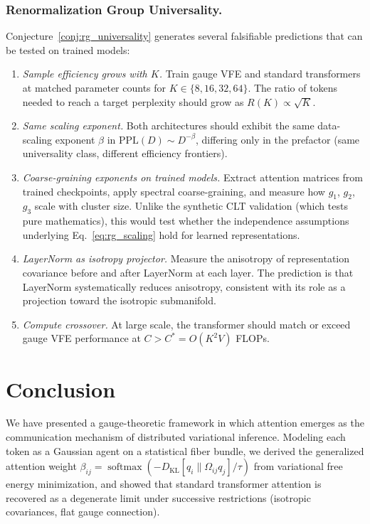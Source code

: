 \documentclass[twoside,11pt]{article}
\newcommand{\softmax}{\operatorname{softmax}}
\newcommand{\KL}{\operatorname{KL}}
\begin{document}
\subsubsection{Renormalization Group Universality.}

Conjecture~\ref{conj:rg_universality} generates several falsifiable predictions that can be tested on trained models:
\begin{enumerate}
\item \emph{Sample efficiency grows with $K$.} Train gauge VFE and standard transformers at matched parameter counts for $K \in \{8, 16, 32, 64\}$. The ratio of tokens needed to reach a target perplexity should grow as $R(K) \propto \sqrt{K}$.
\item \emph{Same scaling exponent.} Both architectures should exhibit the same data-scaling exponent $\beta$ in $\mathrm{PPL}(D) \sim D^{-\beta}$, differing only in the prefactor (same universality class, different efficiency frontiers).
\item \emph{Coarse-graining exponents on trained models.} Extract attention matrices from trained checkpoints, apply spectral coarse-graining, and measure how $g_1$, $g_2$, $g_3$ scale with cluster size. Unlike the synthetic CLT validation (which tests pure mathematics), this would test whether the independence assumptions underlying Eq.~\eqref{eq:rg_scaling} hold for learned representations.
\item \emph{LayerNorm as isotropy projector.} Measure the anisotropy of representation covariance before and after LayerNorm at each layer. The prediction is that LayerNorm systematically reduces anisotropy, consistent with its role as a projection toward the isotropic submanifold.
\item \emph{Compute crossover.} At large scale, the transformer should match or exceed gauge VFE performance at $C > C^* = O(K^2 V)$ FLOPs.
\end{enumerate}

\section{Conclusion}

We have presented a gauge-theoretic framework in which attention emerges as the communication mechanism of distributed variational inference. Modeling each token as a Gaussian agent on a statistical fiber bundle, we derived the generalized attention weight $\beta_{ij} = \softmax(-D_{\KL}[q_i \| \Omega_{ij} q_j]/\tau)$ from variational free energy minimization, and showed that standard transformer attention is recovered as a degenerate limit under successive restrictions (isotropic covariances, flat gauge connection).
\end{document}
